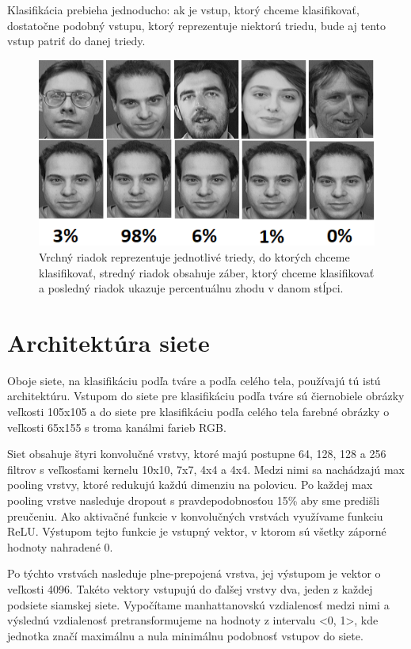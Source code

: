 Klasifikácia prebieha jednoducho: ak je vstup, ktorý chceme klasifikovať, dostatočne podobný vstupu, ktorý reprezentuje niektorú triedu, bude aj tento vstup patriť do danej triedy.

\begin{figure}[H]
\centerline{\includegraphics[width=1\textwidth]{images/oneshot_classification}}
\caption[Klasifikácia pomocou siamskej neurónovej siete]{Vrchný riadok reprezentuje jednotlivé triedy, do ktorých chceme klasifikovať, stredný riadok obsahuje záber, ktorý chceme klasifikovať a posledný riadok ukazuje percentuálnu zhodu v danom stĺpci.}
\label{obr:oneshot_classification}
\end{figure}

\section{Architektúra siete}
Oboje siete, na klasifikáciu podľa tváre a podľa celého tela, používajú tú istú architektúru.
Vstupom do siete pre klasifikáciu podľa tváre sú čiernobiele obrázky veľkosti 105x105 a 
do siete pre klasifikáciu podľa celého tela farebné obrázky o veľkosti 65x155 s troma kanálmi farieb RGB.

Siet obsahuje štyri konvolučné vrstvy, ktoré majú postupne 64, 128, 128 a 256 filtrov s veľkosťami kernelu 10x10, 7x7, 4x4 a 4x4.
Medzi nimi sa nachádzajú max pooling vrstvy, ktoré redukujú každú dimenziu na polovicu.
Po každej max pooling vrstve nasleduje dropout s pravdepodobnosťou 15\% aby sme predišli preučeniu.
Ako aktivačné funkcie v konvolučných vrstvách využívame funkciu ReLU. 
Výstupom tejto funkcie je vstupný vektor, v ktorom sú všetky záporné hodnoty nahradené 0.

Po týchto vrstvách nasleduje plne-prepojená vrstva, jej výstupom je vektor o veľkosti 4096.
Takéto vektory vstupujú do ďalšej vrstvy dva, jeden z každej podsiete siamskej siete.
Vypočítame manhattanovskú vzdialenosť medzi nimi a výslednú vzdialenosť pretransformujeme na hodnoty z intervalu <0, 1>, 
kde jednotka značí maximálnu a nula minimálnu podobnosť vstupov do siete.

